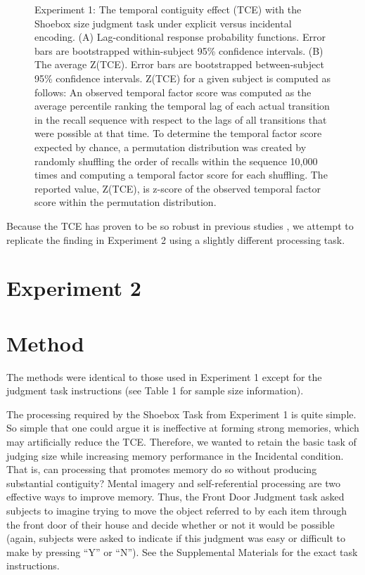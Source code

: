 \documentclass[man,natbib,floatsintext]{apa6} %
\begin{document}
\newcommand\paneltext{(A) Lag-conditional response probability functions. Error bars are bootstrapped within-subject 95\% confidence intervals. (B) The average Z(TCE).  Error bars are bootstrapped between-subject 95\% confidence intervals. Z(TCE) for a given subject is computed as follows: An observed temporal factor score was computed as the average percentile ranking the temporal lag of each actual transition in the recall sequence with respect to the lags of all transitions that were possible at that time. To determine the temporal factor score expected by chance, a permutation distribution was created by randomly shuffling the order of recalls within the sequence 10,000 times and computing a temporal factor score for each shuffling. The reported value, Z(TCE), is z-score of the observed temporal factor score within the permutation distribution.}
\begin{figure}
\caption{Experiment 1: The temporal contiguity effect (TCE) with the Shoebox size judgment task under explicit versus incidental encoding. \paneltext}
\label{shoebox}
\end{figure}



Because the TCE has proven to be so robust in previous studies \citep{HealKaha17}, we attempt to replicate the finding in Experiment 2 using a slightly different processing task.

\section{Experiment 2}
\section{Method}

The methods were identical to those used in Experiment 1 except for the judgment task instructions (see Table 1 for sample size information).

The processing required by the Shoebox Task from Experiment 1 is quite simple. So simple that one could argue it is  ineffective at forming strong memories, which may artificially reduce the TCE. Therefore, we wanted to retain the basic task of judging size while increasing memory performance in the Incidental condition. That is, can processing that promotes memory do so without producing substantial contiguity? Mental imagery and self-referential processing are two effective ways to improve memory. Thus, the Front Door Judgment task asked subjects to imagine trying to move the object referred to by each item through the front door of their house and decide whether or not it would be possible (again, subjects were asked to indicate if this judgment was easy or difficult to make by pressing ``Y'' or ``N''). See the Supplemental Materials for the exact task instructions.
\end{document}
